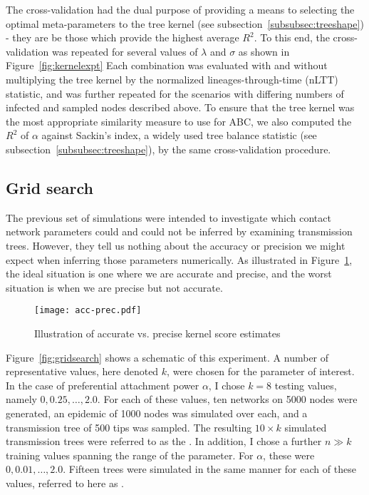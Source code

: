 The cross-validation had the dual purpose of providing a means to selecting the
optimal meta-parameters to the tree kernel (see
subsection~\ref{subsubsec:treeshape}) - they are be those which provide the
highest average $R^2$. To this end, the cross-validation was repeated for
several values of $\lambda$ and $\sigma$ as shown in Figure~\ref{fig:kernelexpt}
Each combination was evaluated with and without multiplying the tree kernel by
the normalized lineages-through-time (nLTT) statistic, and was further repeated
for the scenarios with differing numbers of infected and sampled nodes
described above. To ensure that the tree kernel was the most appropriate
similarity measure to use for ABC, we also computed the $R^2$ of $\alpha$
against Sackin's index, a widely used tree balance statistic (see
subsection~\ref{subsubsec:treeshape}), by the same cross-validation procedure.

\subsection{Grid search}

The previous set of simulations were intended to investigate which contact
network parameters could and could not be inferred by examining transmission
trees. However, they tell us nothing about the accuracy or precision we might
expect when inferring those parameters numerically. As illustrated in
Figure~\ref{fig:accprec}, the ideal situation is one where we are accurate and
precise, and the worst situation is when we are precise but not accurate.

\begin{figure}[ht]
  \centering
  \texttt{[image: acc-prec.pdf]}
  \caption{Illustration of accurate vs. precise kernel score estimates}
  \label{fig:accprec}
\end{figure}

Figure~\ref{fig:gridsearch} shows a schematic of this experiment. A number of
representative values, here denoted $k$, were chosen for the parameter of
interest. In the case of preferential attachment power $\alpha$, I chose $k =
8$ testing values, namely $0, 0.25, \ldots, 2.0$. For each of these values, ten
networks on 5000 nodes were generated, an epidemic of 1000 nodes was simulated
over each, and a transmission tree of 500 tips was sampled. The resulting $10
\times k$ simulated transmission trees were referred to as the . In addition, I chose a further $n \gg k$ training values spanning the
range of the parameter. For $\alpha$, these were $0, 0.01, \ldots, 2.0$.
Fifteen trees were simulated in the same manner for each of these values,
referred to here as .

